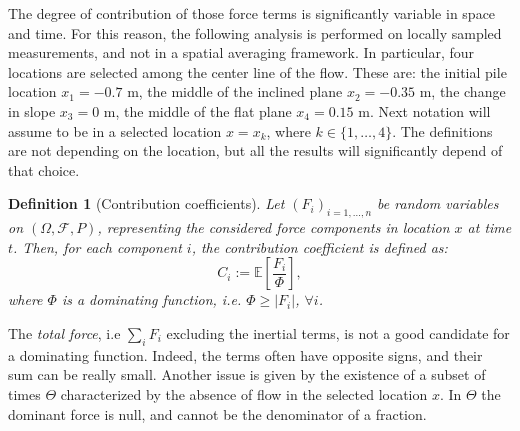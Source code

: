 \documentclass{article}
\newtheorem{definition}[theorem]{Definition}
\begin{document}
The degree of contribution of those force terms is significantly variable in space and time. For this reason, the following analysis is performed on locally sampled measurements, and not in a spatial averaging framework. In particular, four locations are selected among the center line of the flow. These are: the initial pile location $x_1=-0.7$ m, the middle of the inclined plane $x_2=-0.35$ m, the change in slope $x_3=0$ m, the middle of the flat plane $x_4=0.15$ m. Next notation will assume to be in a selected location $x=x_k$, where $k\in\{1,\dots, 4\}$. The definitions are not depending on the location, but all the results will significantly depend of that choice.

\begin{definition}[Contribution coefficients]
Let $(F_i)_{i=1,\dots, n}$ be random variables on $(\Omega, \mathcal F, P)$, representing the considered force components in location $x$ at time $t$. Then, for each component $i$, the contribution coefficient is defined as:
$$C_i:=\mathbb E\left[\frac{F_i}{\Phi}\right],$$
where $\Phi$ is a dominating function, i.e. $\Phi\ge |F_i|$, $\forall i$.
\end{definition}
The \emph{total force}, i.e $\sum_i F_i$ excluding the inertial terms, is not a good candidate for a dominating function. Indeed, the terms often have opposite signs, and their sum can be really small. Another issue is given by the existence of a subset of times $\Theta$ characterized by the absence of flow in the selected location $x$. In $\Theta$ the dominant force is null, and cannot be the denominator of a fraction.
\end{document}

